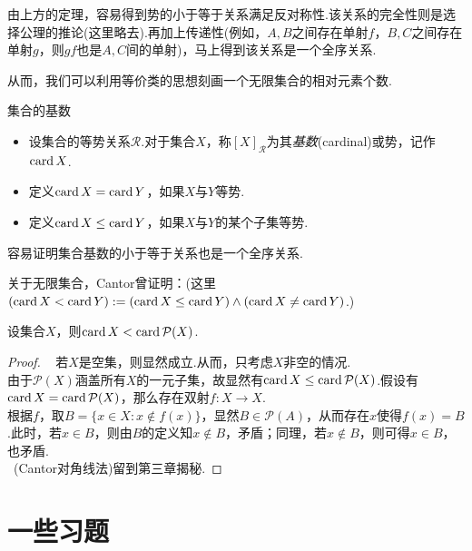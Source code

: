 由上方的定理，容易得到势的小于等于关系满足反对称性.该关系的完全性则是选择公理的推论(这里略去).再加上传递性(例如，$A,B$之间存在单射$f$，$B,C$之间存在单射$g$，则$gf$也是$A,C$间的单射)，马上得到该关系是一个全序关系.

从而，我们可以利用等价类的思想刻画一个无限集合的相对元素个数.

\begin{definition}{集合的基数}
	\begin{itemize}
		\item 设集合的等势关系$\mathcal{R}$.对于集合$X$，称$[X]_{\mathcal{R}}$为其\textit{基数}(cardinal)或势，记作$\operatorname{card} X$.
		\item 定义$\operatorname{card} X = \operatorname{card} Y$，如果$X$与$Y$等势.
		\item 定义$\operatorname{card} X \leq \operatorname{card} Y$，如果$X$与$Y$的某个子集等势.
	\end{itemize}
\end{definition}

容易证明集合基数的小于等于关系也是一个全序关系.

关于无限集合，Cantor曾证明：(这里$(\operatorname{card} X < \operatorname{card} Y):= (\operatorname{card} X \leq \operatorname{card} Y) \wedge (\operatorname{card} X \neq \operatorname{card} Y)$.)

\begin{theorem}
	设集合$X$，则$\operatorname{card} X < \operatorname{card} \mathcal{P}(X)$.
\end{theorem}
\begin{proof}
	~
	若$X$是空集，则显然成立.从而，只考虑$X$非空的情况. \\
	由于$\mathcal{P}(X)$涵盖所有$X$的一元子集，故显然有$\operatorname{card} X \leq \operatorname{card} \mathcal{P}(X)$.假设有$\operatorname{card} X = \operatorname{card} \mathcal{P}(X)$，那么存在双射$f:X \to X$. \\
	根据$f$，取$B=\{ x \in X:x \notin f(x) \}$，显然$B \in \mathcal{P}(A)$，从而存在$x$使得$f(x)=B$.此时，若$x \in B$，则由$B$的定义知$x \notin B$，矛盾；同理，若$x \notin B$，则可得$x \in B$，也矛盾. \\
	~(Cantor对角线法)留到第三章揭秘.
\end{proof}

\section*{一些习题}

